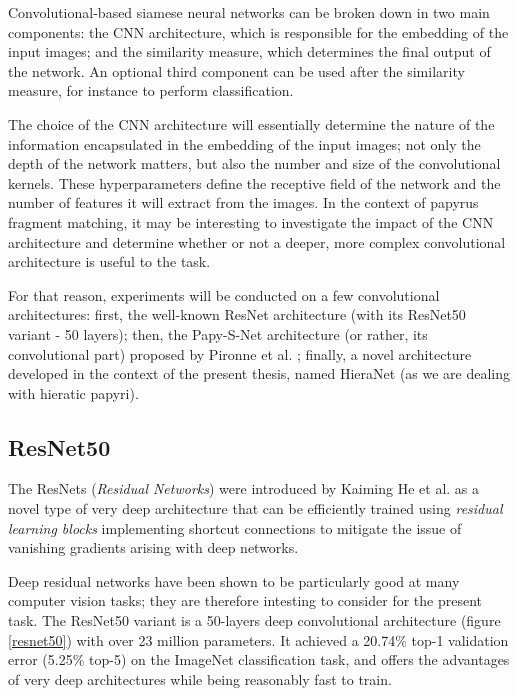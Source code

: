 \documentclass[11pt]{report}
\begin{document}
Convolutional-based siamese neural networks can be broken down in two main components: the CNN architecture, which is responsible for the embedding of the input images; and the similarity measure, which determines the final output of the network. An optional third component can be used after the similarity measure, for instance to perform classification.\newline

The choice of the CNN architecture will essentially determine the nature of the information encapsulated in the embedding of the input images; not only the depth of the network matters, but also the number and size of the convolutional kernels. These hyperparameters define the receptive field of the network and the number of features it will extract from the images.\newline
In the context of papyrus fragment matching, it may be interesting to investigate the impact of the CNN architecture and determine whether or not a deeper, more complex convolutional architecture is useful to the task.\newline

For that reason, experiments will be conducted on a few convolutional architectures: first, the well-known ResNet architecture (with its ResNet50 variant - 50 layers); then, the Papy-S-Net architecture (or rather, its convolutional part) proposed by Pironne et al. \cite{pir19}; finally, a novel architecture developed in the context of the present thesis, named HieraNet (as we are dealing with hieratic papyri).


\subsection{ResNet50}
\label{subsec:resnet}

The ResNets (\emph{Residual Networks}) were introduced by Kaiming He et al. \cite{res15} as a novel type of very deep architecture that can be efficiently trained using \emph{residual learning blocks} implementing shortcut connections to mitigate the issue of vanishing gradients arising with deep networks.\newline




Deep residual networks have been shown to be particularly good at many computer vision tasks; they are therefore intesting to consider for the present task.\newline
The ResNet50 variant is a 50-layers deep convolutional architecture (figure \ref{resnet50}) with over 23 million parameters. It achieved a 20.74\% top-1 validation error (5.25\% top-5) on the ImageNet classification task, and offers the advantages of very deep architectures while being reasonably fast to train.\newline
\end{document}
